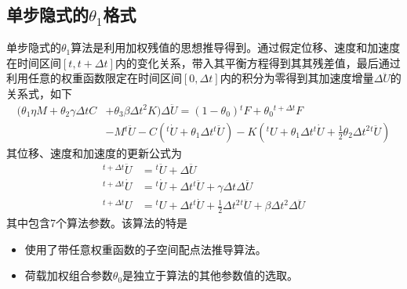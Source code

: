 \subsection{单步隐式的$\theta_1$格式}
单步隐式的$\theta_1$算法\cite{Hoff1988c}是利用加权残值的思想推导得到。通过假定位移、速度和加速度在时间区间$[t,t+\Delta t]$内的变化关系，带入其平衡方程得到其其残差值，最后通过利用任意的权重函数限定在时间区间$[0,\Delta t]$内的积分为零得到其加速度增量$\Delta\ddot{U}$的关系式，如下
\begin{equation}
\begin{aligned}
(\theta_1\eta M+\theta_2\gamma\Delta tC&+\theta_3\beta\Delta t^2K)\Delta\ddot{U}=(1-\theta_0){^t\!F}+\theta_0{^{t+\Delta t}\!F}\\
&-M{^{t}\!\ddot{U}}-C({^t\!\dot{U}}+\theta_1\Delta t{^t\!\ddot{U}})-K({^t\!U}+\theta_1\Delta t{^t\!\dot{U}}+\frac{1}{2}\theta_2\Delta t^2{^t\!\ddot{U}})
\end{aligned}
\end{equation}
其位移、速度和加速度的更新公式为
\begin{align}
{^{t+\Delta t}\!\ddot{U}}&={^t\!\ddot{U}}+\Delta \ddot{U}\\
{^{t+\Delta t}\!\dot{U}}&={^t\!\dot{U}}+\Delta t{^t\!\ddot{U}}+\gamma\Delta t\Delta\ddot{U}\\
{^{t+\Delta t}\!U}&={^t\!U}+\Delta t{^t\!\dot{U}}+\frac12\Delta t^2{^t\!\ddot{U}}+\beta\Delta t^2\Delta\ddot{U}
\end{align}
其中包含7个算法参数。该算法的特是
\begin{itemize}
\item[\ddag] 使用了带任意权重函数的子空间配点法推导算法。
\item[\ddag] 荷载加权组合参数$\theta_0$是独立于算法的其他参数值的选取。
\end{itemize}

